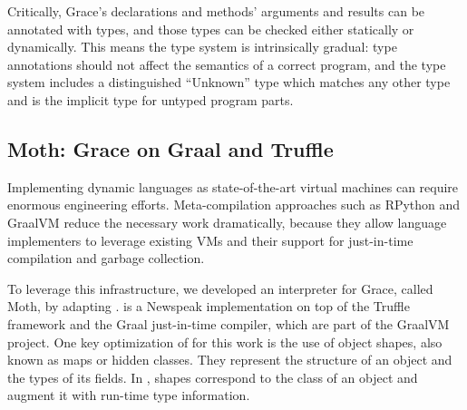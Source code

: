 Critically, Grace's declarations and methods' arguments
and results can be annotated with types, and those types can be  checked
either statically or dynamically. This means the type system is
intrinsically gradual:
%
type annotations should not affect the semantics of a correct
program\citep{XXXSiek2015}, and the type system
includes a distinguished ``Unknown'' type which matches any other type
and is the implicit type for untyped program parts.





\subsection{Moth: Grace on Graal and Truffle}
\label{ssec:moth}

Implementing dynamic languages as state-of-the-art virtual machines
can require enormous engineering efforts.
Meta-compilation approaches\citep{Marr:2015:MTPE}
such as RPython\citep{Bolz:2009:TMP,Bolz:2013:IMT}
and GraalVM\citep{Wurthinger2013,Wurthinger:2017:PPE}
reduce the necessary work dramatically,
because they allow language implementers to leverage existing VMs
and their support for just-in-time compilation and garbage collection.

To leverage this infrastructure, we developed an interpreter for Grace,
called Moth\citep{Roberts2017}, by adapting \SOMns\citep{SOMns}.
\SOMns is a Newspeak implementation\citep{Bracha:10:NS} on top of the Truffle framework and the Graal just-in-time compiler,
which are part of the GraalVM project.
One key optimization of \SOMns for this work is the use of
object shapes\citep{woss2014object},
also known as maps\citep{Self} or hidden classes.
They represent the structure of an object and the types of its fields.
In \SOMns, shapes correspond to the class of an object and augment it with
run-time type information.

